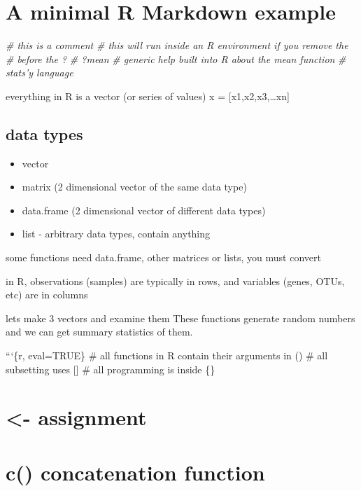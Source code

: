 \documentclass[]{article}
\date{}
\newenvironment{Shaded}{}{}
\newcommand{\CommentTok}[1]{\textcolor[rgb]{0.38,0.63,0.69}{\textit{{#1}}}}
\providecommand{\tightlist}{%
  \setlength{\itemsep}{0pt}\setlength{\parskip}{0pt}}
\begin{document}
\section{A minimal R Markdown
example}\label{a-minimal-r-markdown-example}

\begin{Shaded}
\begin{Highlighting}[]
\CommentTok{# this is a comment}
\CommentTok{# this will run inside an R environment if you remove the # before the ?}
\CommentTok{# ?mean}
\CommentTok{# generic help built into R about the mean function}
\CommentTok{# stats'y language}
\end{Highlighting}
\end{Shaded}

everything in R is a vector (or series of values) x =
{[}x1,x2,x3,\ldots{}xn{]}

\subsection{data types}\label{data-types}

\begin{itemize}
\tightlist
\item
  vector
\item
  matrix (2 dimensional vector of the same data type)
\item
  data.frame (2 dimensional vector of different data types)
\item
  list - arbitrary data types, contain anything
\end{itemize}

some functions need data.frame, other matrices or lists, you must
convert

in R, observations (samples) are typically in rows, and variables
(genes, OTUs, etc) are in columns

lets make 3 vectors and examine them These functions generate random
numbers and we can get summary statistics of them.

```\{r, eval=TRUE\} \# all functions in R contain their arguments in ()
\# all subsetting uses {[}{]} \# all programming is inside \{\}

\section{\textless{}- assignment}\label{assignment}

\section{c() concatenation function}\label{c-concatenation-function}
\end{document}
